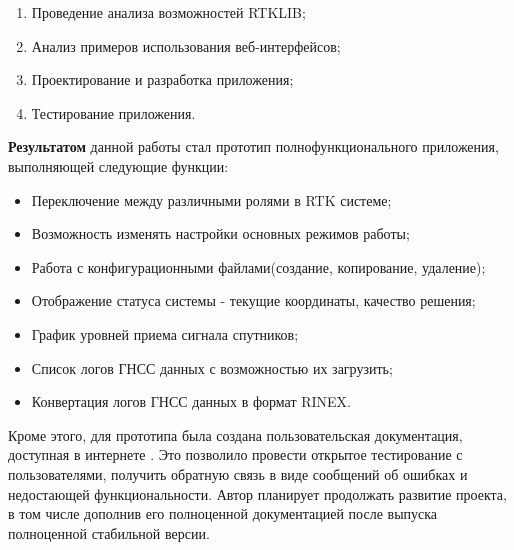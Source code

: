 \begin{enumerate}
  \item Проведение анализа возможностей RTKLIB;
  \item Анализ примеров использования веб-интерфейсов;
  \item Проектирование и разработка приложения;
  \item Тестирование приложения.
\end{enumerate}

\textbf{Результатом} данной работы стал прототип полнофункционального приложения, выполняющей следующие функции:

\begin{itemize}
  \item Переключение между различными ролями в RTK системе;
  \item Возможность изменять настройки основных режимов работы;
  \item Работа с конфигурационными файлами(создание, копирование, удаление);
  \item Отображение статуса системы - текущие координаты, качество решения;
  \item График уровней приема сигнала спутников;
  \item Список логов ГНСС данных с возможностью их загрузить;
  \item Конвертация логов ГНСС данных в формат RINEX.
\end{itemize}

Кроме этого, для прототипа была создана пользовательская документация, доступная в интернете \cite{reach-docs}. Это позволило провести открытое тестирование с пользователями, получить обратную связь в виде сообщений об ошибках и недостающей функциональности. Автор планирует продолжать развитие проекта, в том числе дополнив его полноценной документацией после выпуска полноценной стабильной версии.





